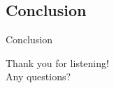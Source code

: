 \documentclass[hyperref={pdfpagelabels=false}]{beamer}
\begin{document}
\subsection{Conclusion}
\begin{frame}{Conclusion}
\begin{center}
Thank you for listening! \\ 
\newline Any questions?
\end{center}
\end{frame}
\end{document}
